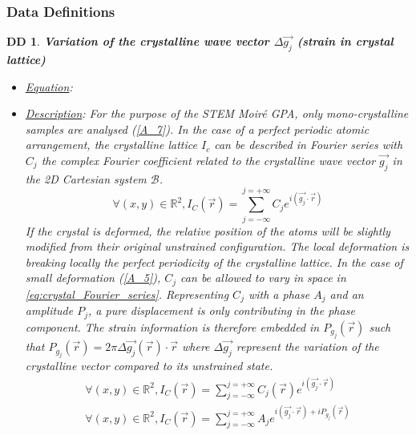 \documentclass[12pt]{article}
\newtheorem{DD}{DD}
\begin{document}
\subsubsection{Data Definitions}\label{sec_datadef}

\renewcommand{\labelitemi}{$\star$}

\begin{DD}
\label{DD_1}
\noindent\colorbox{shadecolorDD}{\normalfont \textbf{Variation of the 
crystalline wave vector $\Delta \overrightarrow{g_j}$ (strain in crystal 
lattice)}}
\normalfont
\begin{itemize}
\item \underline{Equation}: 
\item \underline{Description}: For the purpose of the STEM Moir{\'e} GPA, only 
mono-crystalline samples are analysed (\cref{A_7}). In the case of a perfect 
periodic atomic arrangement, the crystalline lattice $I_c$ can be described in 
Fourier series with $C_j$ the complex Fourier coefficient related to the 
crystalline wave vector $\vec{g_j}$ in the 2D Cartesian system $\mathcal{B}$.
\begin{equation}
\forall (x,y) \in 
\mathbb{R}^{2},I_C(\vec{r})=\sum_{j=-\infty}^{j=+\infty}C_je^{i(\vec{g_j}\cdot\vec{r})}
\label{eq:crystal_Fourier_series}
\end{equation}
If the crystal is deformed, the relative position of the atoms will be slightly 
modified from their original unstrained configuration. The local deformation is 
breaking locally the perfect periodicity of the crystalline lattice. In the case 
of small deformation (\cref{A_5}), $C_j$ can be allowed to vary in space in 
\cref{eq:crystal_Fourier_series}. Representing $C_j$ with a phase $A_j$ and an 
amplitude $P_j$, a pure displacement is only contributing in the phase 
component. The strain information is therefore embedded in $P_{g_{j}}(\vec{r})$ 
such that $P_{g_{j}}(\vec{r})=2\pi\Delta 
\overrightarrow{g_{j}}(\vec{r})\cdot\vec{r}$ where $\Delta \overrightarrow{g_j}$ 
represent the variation of the crystalline vector compared to its unstrained 
state.
\begin{equation}
\begin{gathered}
\forall (x,y) \in 
\mathbb{R}^{2},I_C(\vec{r})=\sum_{j=-\infty}^{j=+\infty}C_j(\vec{r})e^{i(\vec{g_j}\cdot\vec{r})} 
\\
\forall (x,y) \in 
\mathbb{R}^{2},I_C(\vec{r})=\sum_{j=-\infty}^{j=+\infty}A_je^{i(\vec{g_j}\cdot\vec{r})+iP_{g_{j}}(\vec{r})}
\end{gathered}

\end{equation}
\end{itemize}
\end{DD}
\end{document}
